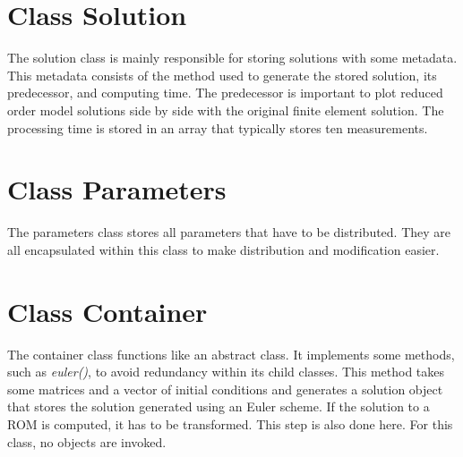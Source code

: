 \section{Class Solution}
The solution class is mainly responsible for storing solutions with some metadata.
This metadata consists of the method used to generate the stored solution, its predecessor, and computing time.
The predecessor is important to plot reduced order model solutions side by side with the original finite element solution.
The processing time is stored in an array that typically stores ten measurements.

\section{Class Parameters}
The parameters class stores all parameters that have to be distributed.
They are all encapsulated within this class to make distribution and modification easier.

\section{Class Container}
The container class functions like an abstract class.
It implements some methods, such as \textit{euler()}, to avoid redundancy within its child classes.
This method takes some matrices and a vector of initial conditions and generates a solution object that stores the solution generated using an Euler scheme.
If the solution to a ROM is computed, it has to be transformed.
This step is also done here.
For this class, no objects are invoked.

